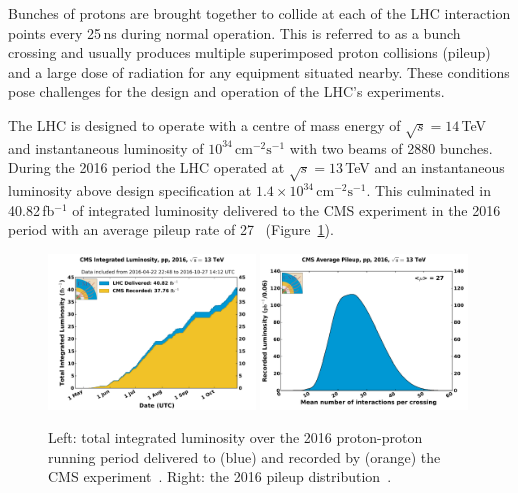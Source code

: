Bunches of protons are brought together to collide at each of the LHC interaction points every 25\,ns during normal operation. This is referred to as a bunch crossing and usually produces multiple superimposed proton collisions (pileup) and a large dose of radiation for any equipment situated nearby. These conditions pose challenges for the design and operation of the LHC's experiments. 

The LHC is designed to operate with a centre of mass energy of $\sqrt{s}=14$\,TeV and instantaneous luminosity of $10^{34}$\,$\mathrm{cm}^{-2}\mathrm{s}^{-1}$ with two beams of 2880 bunches. During the 2016 period the LHC operated at $\sqrt{s} = 13$\,TeV and an instantaneous luminosity above design specification at $1.4\times{}10^{34}$\,$\mathrm{cm}^{-2}\mathrm{s}^{-1}$. This culminated in 40.82\,fb$^{-1}$ of integrated luminosity delivered to the CMS experiment in the 2016 period with an average pileup rate of 27~\cite{CMSLumiPublic} (Figure~\ref{fig:apparatus:cms_int_lumi}).
\begin{figure}[h!]
    \begin{center}
    \includegraphics[width=0.49\textwidth]{figures/apparatus/int_lumi_per_day_cumulative_pp_2016.pdf}
    \includegraphics[width=0.49\textwidth]{figures/apparatus/pileup_pp_2016.pdf}
    \end{center}
    \caption{Left: total integrated luminosity over the 2016 proton-proton running period delivered to (blue) and recorded by (orange) the CMS experiment~\cite{CMSLumiPublic}. Right: the 2016 pileup distribution~\cite{CMSLumiPublic}.}
    \label{fig:apparatus:cms_int_lumi}
\end{figure}


